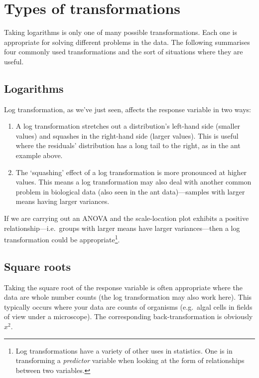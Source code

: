 \documentclass[
]{book}
\begin{document}
\hypertarget{trans-types}{%
\section{Types of transformations}\label{trans-types}}

Taking logarithms is only one of many possible transformations. Each one is appropriate for solving different problems in the data. The following summarises four commonly used transformations and the sort of situations where they are useful.

\hypertarget{logarithms}{%
\subsection{Logarithms}\label{logarithms}}

Log transformation, as we've just seen, affects the response variable in two ways:

\begin{enumerate}
\def\labelenumi{\arabic{enumi}.}
\item
  A log transformation stretches out a distribution's left-hand side (smaller values) and squashes in the right-hand side (larger values). This is useful where the residuals' distribution has a long tail to the right, as in the ant example above.
\item
  The `squashing' effect of a log transformation is more pronounced at higher values. This means a log transformation may also deal with another common problem in biological data (also seen in the ant data)---samples with larger means having larger variances.
\end{enumerate}

If we are carrying out an ANOVA and the scale-location plot exhibits a positive relationship---i.e.~groups with larger means have larger variances---then a log transformation could be appropriate\footnote{Log transformations have a variety of other uses in statistics. One is in transforming a \emph{predictor} variable when looking at the form of relationships between two variables.}.

\hypertarget{square-roots}{%
\subsection{Square roots}\label{square-roots}}

Taking the square root of the response variable is often appropriate where the data are whole number counts (the log transformation may also work here). This typically occurs where your data are counts of organisms (e.g.~algal cells in fields of view under a microscope). The corresponding back-transformation is obviously \(x^{2}\).
\end{document}
